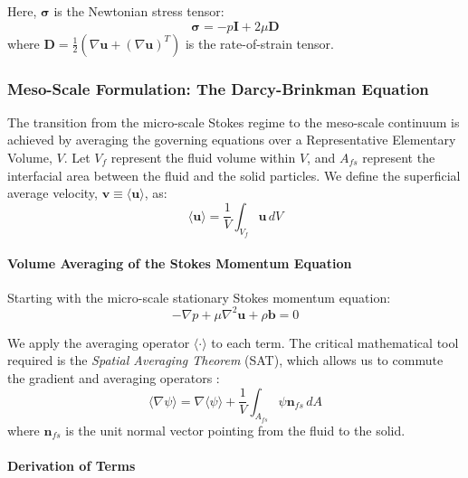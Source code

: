 Here, $\boldsymbol{\sigma}$ is the Newtonian stress tensor:
\begin{equation}
    \boldsymbol{\sigma} = -p\mathbf{I} + 2\mu \mathbf{D}
\end{equation}
where $\mathbf{D} = \frac{1}{2}(\nabla \mathbf{u} + (\nabla \mathbf{u})^T)$ is the rate-of-strain tensor.

\subsubsection{Meso-Scale Formulation: The Darcy-Brinkman Equation}

The transition from the micro-scale Stokes regime to the meso-scale continuum is achieved by averaging the governing equations over a Representative Elementary Volume, $V$.
Let $V_f$ represent the fluid volume within $V$, and $A_{fs}$ represent the interfacial area between the fluid and the solid particles.
We define the superficial average velocity, $\mathbf{v} \equiv \langle \mathbf{u} \rangle$, as:
\begin{equation}
    \langle \mathbf{u} \rangle = \frac{1}{V} \int_{V_f} \mathbf{u} \, dV
\end{equation}

\paragraph{Volume Averaging of the Stokes Momentum Equation}
Starting with the micro-scale stationary Stokes momentum equation:
\begin{equation}
    -\nabla p + \mu \nabla^2 \mathbf{u} + \rho \mathbf{b} = 0
\end{equation}

We apply the averaging operator $\langle \cdot \rangle$ to each term.
The critical mathematical tool required is the \textit{Spatial Averaging Theorem} (SAT), which allows us to commute the gradient and averaging operators \cite{whitaker1999method}:
\begin{equation}
    \langle \nabla \psi \rangle = \nabla \langle \psi \rangle + \frac{1}{V} \int_{A_{fs}} \psi \mathbf{n}_{fs} \, dA
\end{equation}
where $\mathbf{n}_{fs}$ is the unit normal vector pointing from the fluid to the solid.

\paragraph{Derivation of Terms}

